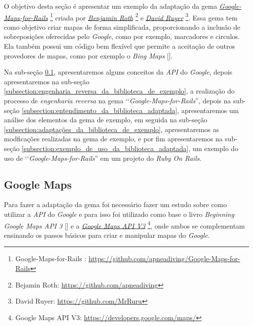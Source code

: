 O objetivo desta seção é apresentar um exemplo da adaptação da gema
\emph{\href{https://github.com/apneadiving/Google-Maps-for-Rails}{Google-Maps-for-Rails}} 
\footnote{Google-Maps-for-Rails : \url{https://github.com/apneadiving/Google-Maps-for-Rails}} criada por 
\emph{\href{https://github.com/apneadiving}{Benjamin Roth}} 
\footnote{Bejamin Roth: \url{https://github.com/apneadiving}} e 
\emph{\href{https://github.com/MrRuru}{David Ruyer}} \footnote{David Ruyer: \url{https://github.com/MrRuru}}.
Essa gema tem como objetivo criar mapas de forma simplificada, proporcionando a inclusão de
sobreposições oferecidas pelo \emph{Google}, como por exemplo, marcadores e circulos. Ela também possui
um código bem flexível que permite a aceitação de outros provedores de mapas, como por exemplo o
\emph{Bing Maps} [].

Na sub-seção \ref{subsection:google_maps}, apresentaremos alguns conceitos da \emph{API} do
\emph{Google}, depois apresentaremos na sub-seção \ref{subsection:engenharia_reversa_da_biblioteca_de_exemplo},
a realização do processo de \emph{engenharia reversa} na gema ‘‘\emph{Google-Maps-for-Rails}'', depois na
sub-seção \ref{subsection:entendimento_da_biblioteca_adaptada}, apresentaremos um análise dos elementos
da gema de exemplo, em seguida na sub-seção \ref{subsection:adaptações_da_biblioteca_de_exemplo},
apresentaremos as modficações realizadas na gema de exemplo, e por fim apresentaremos na sub-seção
\ref{subsection:exemplo_de_uso_da_biblioteca_adaptada}, um exemplo do uso de ‘‘\emph{Google-Maps-for-Rails}''
em um projeto do \emph{Ruby On Rails}.


\subsection{Google Maps}
\label{subsection:google_maps}


Para fazer a adaptação da gema foi necessário fazer um estudo sobre como utilizar a \emph{API} do 
\emph{Google} e para isso foi utilizado como base o livro \emph{Beginning Google Maps API 3} 
[] e a 
\emph{\href{https://developers.google.com/maps/}{Google Maps API V3}} 
\footnote{Google Maps API V3: \url{https://developers.google.com/maps/}}, onde ambos se complementam 
ensinando os passos básicos para criar e manipular mapas do \emph{Google}. 

